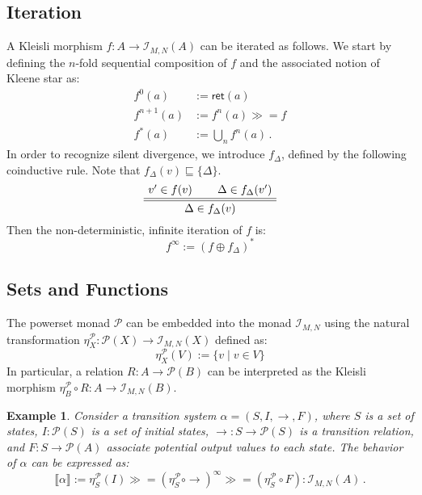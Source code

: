 \documentclass{article}
\newtheorem{example}{Example}
\newcommand{\kw}[1]{\ensuremath{ \mathsf{#1} }}
\newcommand{\bind}{\gg\!\!=}
\begin{document}

\subsection{Iteration} \label{sec:monad:iter} %

A Kleisli morphism $f : A \rightarrow \mathcal{I}_{M,N}(A)$
can be iterated as follows.
We start by defining
the $n$-fold sequential composition of $f$
and the associated notion of Kleene star as:
\begin{align*}
    f^0(a) &:= \kw{ret}(a) \\
    f^{n+1}(a) &:= f^n(a) \bind f \\
    f^*(a) &:= \bigcup_n f^n(a) \,.
\end{align*}
In order to recognize silent divergence,
we introduce $f_\Delta$,
defined by the following coinductive rule.
Note that $f_\Delta(v) \sqsubseteq \{\Delta\}$.
\[
    \AxiomC{$v' \in f(v)$}
    \AxiomC{$\Delta \in f_\Delta(v')$}
    \doubleLine
    \BinaryInfC{$\Delta \in f_\Delta(v)$}
    \DisplayProof
\]
Then the non-deterministic, infinite iteration of $f$ is:
\[
    f^\infty := (f \oplus f_\Delta)^*
\]


\subsection{Sets and Functions} %

The powerset monad $\mathcal{P}$
can be embedded into the monad $\mathcal{I}_{M,N}$
using the natural transformation
$\eta^\mathcal{P}_X : \mathcal{P}(X) \rightarrow \mathcal{I}_{M,N}(X)$
defined as:
\[
    \eta^\mathcal{P}_X(V) := \{ v \mid v \in V \}
\]
In particular,
a relation $R : A \rightarrow \mathcal{P}(B)$
can be interpreted as the Kleisli morphism
$\eta^\mathcal{P}_B \circ R : A \rightarrow \mathcal{I}_{M,N}(B)$.

\begin{example} \label{ex:ts} %
Consider a transition system $\alpha = (S, I, {\rightarrow}, F)$,
where
$S$ is a set of states,
$I : \mathcal{P}(S)$
is a set of initial states,
${\rightarrow} : S \rightarrow \mathcal{P}(S)$
is a transition relation, and
$F : S \rightarrow \mathcal{P}(A)$
associate potential output values to each state.
The behavior of $\alpha$ can be expressed as:
\[
    \llbracket \alpha \rrbracket :=
    \eta^\mathcal{P}_S(I) \bind
    (\eta^\mathcal{P}_S \circ {\rightarrow})^\infty \bind
    (\eta^\mathcal{P}_S \circ F)
    : \mathcal{I}_{M,N}(A) \,.
\]
\end{example}
\end{document}
